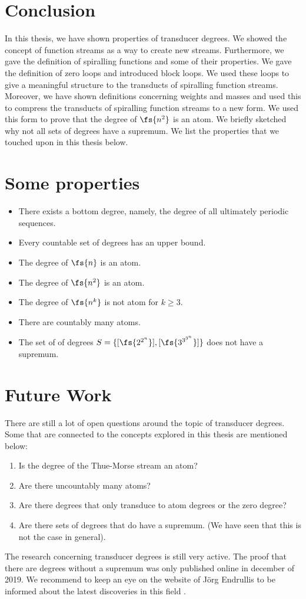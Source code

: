 \section*{Conclusion}
In this thesis, we have shown properties of transducer degrees. We showed the concept of function streams as a way to create new streams. Furthermore, we gave the definition of spiralling functions and some of their properties. We gave the definition of zero loops and introduced block loops. We used these loops to give a meaningful structure to the transducts of spiralling function streams. Moreover, we have shown definitions concerning weights and masses and used this to compress the transducts of spiralling function streams to a new form. We used this form to prove that the degree of $\fs{n^2}$ is an atom. We briefly sketched why not all sets of degrees have a supremum. We list the properties that we touched upon in this thesis below.

\section*{Some properties}
\begin{itemize}
	\item There exists a bottom degree, namely, the degree of all ultimately periodic sequences.
	\item Every countable set of degrees has an upper bound.
	\item The degree of $\fs{n}$ is an atom.
	\item The degree of $\fs{n^2}$ is an atom.
	\item The degree of $\fs{n^k}$ is not atom for $k\geq 3$.
	\item There are countably many atoms.
	\item The set of of degrees $S = \{[\fs{2^{2^n}}],[\fs{3^{3^{3^n}}}]\}$ does not have a supremum.
\end{itemize}

\section*{Future Work}
There are still a lot of open questions around the topic of transducer degrees. Some that are connected to the concepts explored in this thesis are mentioned below:
\begin{enumerate}
	\item Is the degree of the Thue-Morse stream an atom?
	\item Are there uncountably many atoms?
	\item Are there degrees that only transduce to atom degrees or the zero degree?
	\item Are there sets of degrees that do have a supremum. (We have seen that this is not the case in general).
\end{enumerate}
The research concerning transducer degrees is still very active. The proof that there are degrees without a supremum was only published online in december of 2019. We recommend to keep an eye on the website of Jörg Endrullis to be informed about the latest discoveries in this field \cite{websiteofjeorg}.
